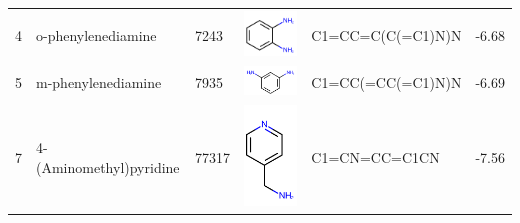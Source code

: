 \documentclass[aps,pre,twocolumn,nofootinbib,superscriptaddress,10pt, final,tightenlines]{revtex4-1}
\begin{document}
\begin{table}
\begin{tabular}{lllp{2cm}>{\ttfamily}lS[table-format=-1.2, table-figures-uncertainty=1]}
4   & o-phenylenediamine       & 7243      & \parbox[c]{1em}{\includegraphics[scale=0.2]{figures/7243.pdf}}  & C1=CC=C(C(=C1)N)N                    & -6.68                                             \\
5   & m-phenylenediamine       & 7935      & \parbox[c]{1em}{\includegraphics[scale=0.2]{figures/7935.pdf}}  & C1=CC(=CC(=C1)N)N                    & -6.69                                             \\
7   & 4-(Aminomethyl)pyridine  & 77317     & \parbox[c]{1em}{\includegraphics[scale=0.2]{figures/77317.pdf}} & C1=CN=CC=C1CN                        & -7.56                                             \\

\end{tabular}
\end{table}
\end{document}
